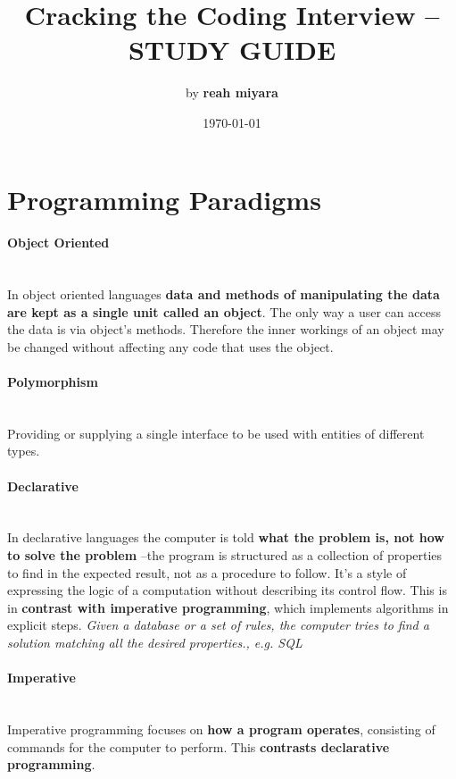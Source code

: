 \documentclass[10pt]{article}
\begin{document}
\setcounter{secnumdepth}{-1}

\title{Cracking the Coding Interview -- STUDY GUIDE}
\author{by {\bf reah miyara} }
\date{\today}
\maketitle

\section{Programming Paradigms}\smallskip

\paragraph{Object Oriented}\ \\
In object oriented languages {\bf data and methods of manipulating the data are kept as a single unit called an object}. The only way a user can access the data is via object's methods. Therefore the inner workings of an object may be changed without affecting any code that uses the object. 
\begin{addmargin}[3em]{2em}%

{\indent \vspace{-10pt} \paragraph{Polymorphism}\ \\
 Providing or supplying a single interface to be used with entities of different types. }
\end{addmargin}

\paragraph{Declarative}\ \\
In declarative languages the computer is told {\bf what the problem is, not how to solve the problem} --the program is structured as a collection of properties to find in the expected result, not as a procedure to follow. It's a style of expressing the logic of a computation without describing its control flow. This is in {\bf contrast with imperative programming}, which implements algorithms in explicit steps. {\it Given a database or a set of rules, the computer tries to find a solution matching all the desired properties., e.g. SQL}

\paragraph{Imperative}\ \\
Imperative programming focuses on {\bf how a program operates}, consisting of commands for the computer to perform. This {\bf contrasts declarative programming}.
\end{document}
